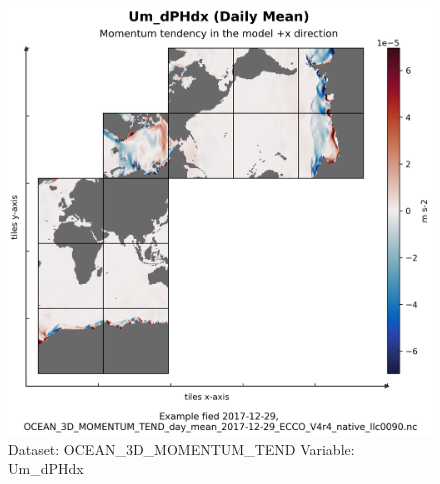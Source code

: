 \begin{figure}[H]
\centering
\includegraphics[scale=0.55]{../images/plots/native_plots/Ocean_Three-Dimensional_Momentum_Tendency/Um_dPHdx.png}
\caption{Dataset: OCEAN\_3D\_MOMENTUM\_TEND Variable: Um\_dPHdx}
\label{tab:table-OCEAN_3D_MOMENTUM_TEND_Um_dPHdx-Plot}
\end{figure}
\pagebreak
